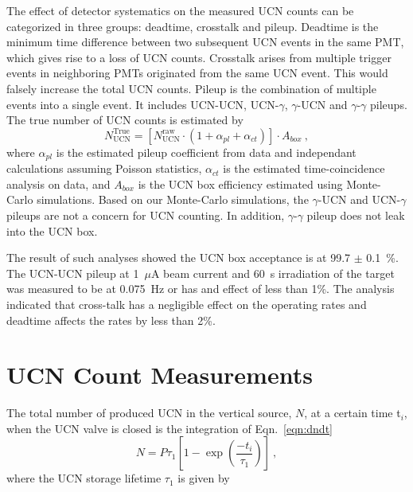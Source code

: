 The effect of detector systematics on the measured UCN counts can be
categorized in three groups: deadtime, crosstalk and pileup. Deadtime
is the minimum time difference between two subsequent UCN events in
the same PMT, which gives rise to a loss of UCN counts. Crosstalk
arises from multiple trigger events in neighboring PMTs originated
from the same UCN event. This would falsely increase the total UCN
counts. Pileup is the combination of multiple events into a single
event. It includes UCN-UCN, UCN-$\gamma$, $\gamma$-UCN and
$\gamma$-$\gamma$ pileups. The true number of UCN counts is estimated
by
\begin{equation}
  \label{eqn:trueUCN}
  N^{\mathrm{True}}_{\mathrm{UCN}} = \left [ N^{\mathrm{raw}}_{\mathrm{UCN}} \cdot \left( 1 + \alpha_{pl} + \alpha_{ct}\right) \right] \cdot A_{box}~,
\end{equation}
where $\alpha_{pl}$ is the estimated pileup coefficient from data and
independant calculations assuming Poisson statistics, $\alpha_{ct}$ is
the estimated time-coincidence analysis on data, and $A_{box}$ is the
UCN box efficiency estimated using Monte-Carlo simulations. Based on
our Monte-Carlo simulations, the $\gamma$-UCN and UCN-$\gamma$ pileups
are not a concern for UCN counting. In addition, $\gamma$-$\gamma$
pileup does not leak into the UCN box.

The result of such analyses showed the UCN box acceptance is at 99.7
$\pm$ 0.1~\%. The UCN-UCN pileup at 1~$\mu$A beam current and 60~s
irradiation of the target was measured to be at 0.075~Hz or has and
effect of less than 1\%. The analysis indicated that cross-talk has a
negligible effect on the operating rates and deadtime affects the
rates by less than 2\%.



\section{UCN Count Measurements \label{UCNCounts}}

The total number of produced UCN in the vertical source, $N$, at a
certain time t$_i$, when the UCN valve is closed is the integration of
Eqn.~\ref{eqn:dndt}
\begin{equation}
  \label{eq:totalUCN}
  N = P \tau_1\left[ 1- \exp \left(\frac{-t_i }{ \tau_1}\right) \right]~,
\end{equation}
where the UCN storage lifetime $\tau_1$ is given by

